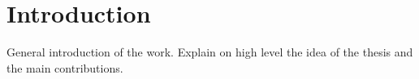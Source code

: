 \chapter{Introduction}
\label{cha:intro}
General introduction of the work. Explain on high level the idea of the thesis and the main contributions.

